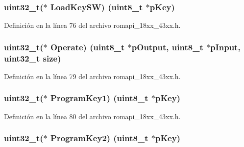 \subsubsection[{\texorpdfstring{Load\+Key\+SW}{LoadKeySW}}]{\setlength{\rightskip}{0pt plus 5cm}uint32\+\_\+t($\ast$ Load\+Key\+SW) (uint8\+\_\+t $\ast$p\+Key)}\hypertarget{struct_a_e_s___a_p_i___t_a123b9aa75ddb666dc654ab2044badfcb}{}\label{struct_a_e_s___a_p_i___t_a123b9aa75ddb666dc654ab2044badfcb}


Definición en la línea 76 del archivo romapi\+\_\+18xx\+\_\+43xx.\+h.

\subsubsection[{\texorpdfstring{Operate}{Operate}}]{\setlength{\rightskip}{0pt plus 5cm}uint32\+\_\+t($\ast$ Operate) (uint8\+\_\+t $\ast$p\+Output, uint8\+\_\+t $\ast$p\+Input, uint32\+\_\+t size)}\hypertarget{struct_a_e_s___a_p_i___t_aee88458276a7d0fbba60349e243d9c75}{}\label{struct_a_e_s___a_p_i___t_aee88458276a7d0fbba60349e243d9c75}


Definición en la línea 79 del archivo romapi\+\_\+18xx\+\_\+43xx.\+h.

\subsubsection[{\texorpdfstring{Program\+Key1}{ProgramKey1}}]{\setlength{\rightskip}{0pt plus 5cm}uint32\+\_\+t($\ast$ Program\+Key1) (uint8\+\_\+t $\ast$p\+Key)}\hypertarget{struct_a_e_s___a_p_i___t_a41478b6b72c35c5910d9dc92f438352e}{}\label{struct_a_e_s___a_p_i___t_a41478b6b72c35c5910d9dc92f438352e}


Definición en la línea 80 del archivo romapi\+\_\+18xx\+\_\+43xx.\+h.

\subsubsection[{\texorpdfstring{Program\+Key2}{ProgramKey2}}]{\setlength{\rightskip}{0pt plus 5cm}uint32\+\_\+t($\ast$ Program\+Key2) (uint8\+\_\+t $\ast$p\+Key)}\hypertarget{struct_a_e_s___a_p_i___t_ad8bbd5c2f0dfd1b3be8ffad8ebcf8b37}{}\label{struct_a_e_s___a_p_i___t_ad8bbd5c2f0dfd1b3be8ffad8ebcf8b37}


